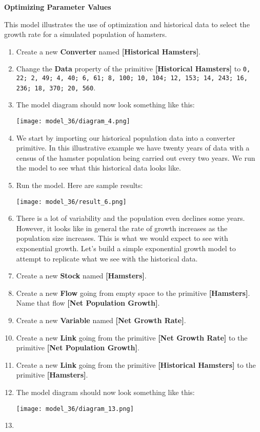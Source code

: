 \documentclass[]{memoir}
\makeatletter
\def\maxwidth{\ifdim\Gin@nat@width>\linewidth\linewidth
\else\Gin@nat@width\fi}
\let\Oldincludegraphics\includegraphics
\renewcommand{\includegraphics}[1]{\Oldincludegraphics[width=\maxwidth]{#1}}
\newcommand{\p}[1]{\textbf{{[}#1{]}}}
\newcommand{\e}[1]{\texttt{#1}}
\renewcommand{\a}[1]{\textbf{#1}}
\makeatother
\begin{document}
\FloatBarrier 

\begin{oframed}\textbf{Optimizing Parameter Values} 

 This model illustrates the use of optimization and historical data to select the growth rate for a simulated population of hamsters.

\begin{enumerate}
\item Create a new \a{Converter} named \p{Historical Hamsters}.
\item  Change the \a{Data} property of the primitive \p{Historical Hamsters} to \e{0, 22; 2, 49; 4, 40; 6, 61; 8, 100; 10, 104; 12, 153; 14, 243; 16, 236; 18, 370; 20, 560}.
\item The model diagram should now look something like this: \par \begin{minipage}{\linewidth}  \centering \texttt{[image: model\_36/diagram\_4.png]}
\end{minipage}
\item 

We start by importing our historical population data into a converter primitive. In this illustrative example we have twenty years of data with a census of the hamster population being carried out every two years. We run the model to see what this historical data looks like.


\item Run the model. Here are sample results:\par \begin{minipage}{\linewidth}  \centering \texttt{[image: model\_36/result\_6.png]}
\end{minipage}
\item 

There is a lot of variability and the population even declines some years. However, it looks like in general the rate of growth increases as the population size increases. This is what we would expect to see with exponential growth. Let's build a simple exponential growth model to attempt to replicate what we see with the historical data.


\item Create a new \a{Stock} named \p{Hamsters}.
\item Create a new \a{Flow} going from empty space to the primitive \p{Hamsters}. Name that flow \p{Net Population Growth}.
\item Create a new \a{Variable} named \p{Net Growth Rate}.
\item Create a new \a{Link} going from the primitive \p{Net Growth Rate} to the primitive \p{Net Population Growth}.
\item Create a new \a{Link} going from the primitive \p{Historical Hamsters} to the primitive \p{Hamsters}.
\item The model diagram should now look something like this: \par \begin{minipage}{\linewidth}  \centering \texttt{[image: model\_36/diagram\_13.png]}
\end{minipage}
\item 


\end{enumerate}
\end{oframed}
\end{document}
